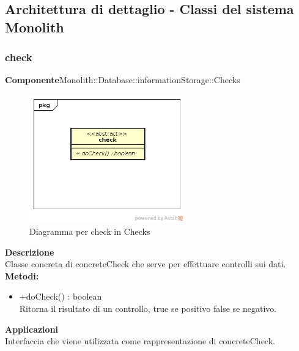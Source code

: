 \clearpage

\subsection{Architettura di dettaglio - Classi del sistema Monolith}\subsubsection{check}
\textbf{Componente}Monolith::Database::informationStorage::Checks\\
   \FloatBarrier
   \begin{figure}[ht]
   \centering
   \includegraphics[width=0.6\textwidth]{img/single-check}
   \caption{{Diagramma per check in Checks}}
\end{figure}
\FloatBarrier
\textbf{Descrizione}\\
Classe concreta di concreteCheck che serve per effettuare controlli sui dati.
\textbf{Metodi:}
\begin{itemize}\item +doCheck() : boolean \\Ritorna il risultato di un controllo, true se positivo false se negativo.\end{itemize} 


\textbf{Applicazioni}\\
Interfaccia che viene utilizzata come rappresentazione di concreteCheck. 


\clearpage

